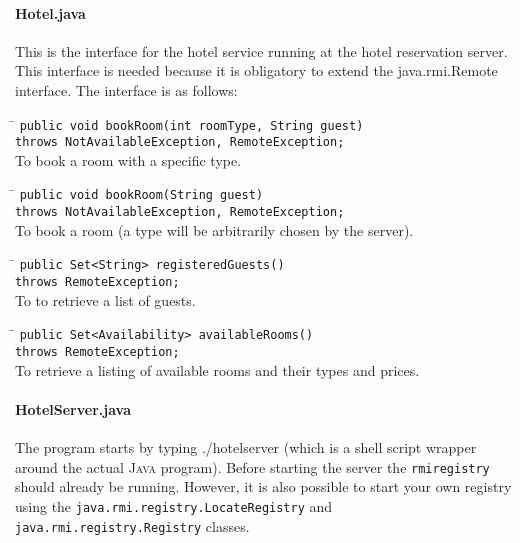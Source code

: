 \documentclass[a4paper,10pt]{article}
\begin{document}
\paragraph{Hotel.java}
This is the interface for the hotel service running at the hotel reservation server. This interface is needed because it is obligatory to extend the java.rmi.Remote interface. The interface is as follows:

\begin{tabbing}
\hspace{20pt}\=\kill
 \> \texttt{publ}\=\texttt{ic void bookRoom(int roomType, String guest)} \+ \\
 \> \texttt{throws NotAvailableException, RemoteException;} \- \\
 \> To book a room with a specific type.
\end{tabbing}

\begin{tabbing}
\hspace{20pt}\=\kill
 \> \texttt{publ}\=\texttt{ic void bookRoom(String guest)} \+\\
 \> \texttt{throws NotAvailableException, RemoteException;} \- \\
 \> To book a room (a type will be arbitrarily chosen by the server).
\end{tabbing}

\begin{tabbing}
\hspace{20pt}\=\kill
 \> \texttt{publ}\=\texttt{ic Set<String> registeredGuests()} \+\\
 \> \texttt{throws RemoteException;} \- \\
 \> To to retrieve a list of guests.
\end{tabbing}

\begin{tabbing}
\hspace{20pt}\=\kill
 \> \texttt{publ}\=\texttt{ic Set<Availability> availableRooms()} \+\\
 \> \texttt{throws RemoteException;} \- \\
 \> To retrieve a listing of available rooms and their types and prices.
\end{tabbing}


\paragraph{HotelServer.java}
The program starts by typing ./hotelserver (which is a shell script wrapper around the actual \textsc{Java} program). Before starting the server the \texttt{rmiregistry} should already be running. However, it is also possible to start your own registry using the \texttt{java.rmi.registry.LocateRegistry} and \texttt{java.rmi.registry.Registry} classes.
\end{document}
